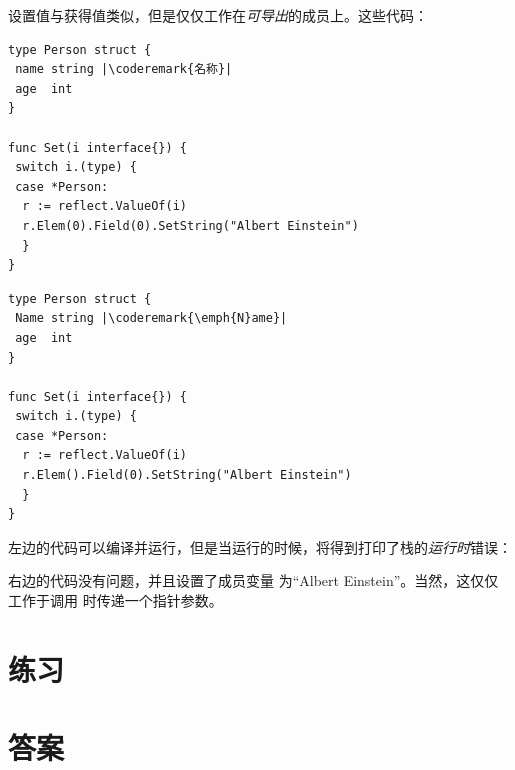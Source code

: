 设置值与获得值类似，但是仅仅工作在\emph{可导出}的成员上。这些代码：

\begin{minipage}{.5\textwidth}
\begin{lstlisting}[caption=私有成员的反射]
type Person struct {
 name string |\coderemark{名称}|
 age  int
}

func Set(i interface{}) {
 switch i.(type) {
 case *Person:
  r := reflect.ValueOf(i)
  r.Elem(0).Field(0).SetString("Albert Einstein")
  }
}
\end{lstlisting}
\end{minipage}
\hspace{2em}
\begin{minipage}{.5\textwidth}
\begin{lstlisting}[caption=公有成员的反射]
type Person struct {
 Name string |\coderemark{\emph{N}ame}|
 age  int
}

func Set(i interface{}) {
 switch i.(type) {
 case *Person:
  r := reflect.ValueOf(i)
  r.Elem().Field(0).SetString("Albert Einstein")
  }
}
\end{lstlisting}
\end{minipage}
左边的代码可以编译并运行，但是当运行的时候，将得到打印了栈的\emph{运行时}错误：

\noindent{}

\noindent{}右边的代码没有问题，并且设置了成员变量  
为``Albert Einstein''。当然，这仅仅工作于调用  时传递一个指针参数。

\section{练习}






\cleardoublepage
\section{答案}
\shipoutAnswer
